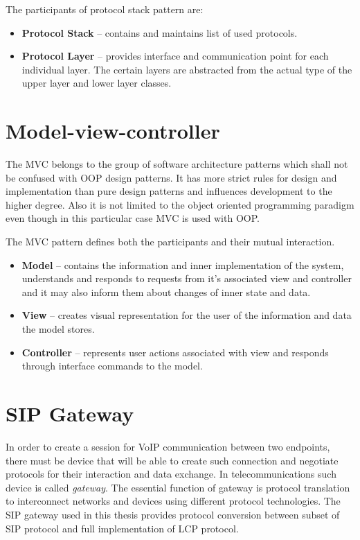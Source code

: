 The participants of protocol stack pattern are:
\begin{itemize}
\item \textbf{Protocol Stack} -- contains and maintains list of used protocols.
\item \textbf{Protocol Layer} -- provides interface and communication point for 
each individual layer. The certain layers are abstracted from the actual type of
the upper layer and lower layer classes.
\end{itemize}



\section{Model-view-controller}
The MVC belongs to the group of software architecture patterns which shall not
be confused with OOP design patterns. It has more strict rules for design
and implementation than pure design patterns and influences development to the
higher degree. Also it is not limited to the object oriented programming 
paradigm even though in this particular case MVC is used with OOP.

The MVC pattern defines both the participants and their mutual interaction.
\begin{itemize}
\item \textbf{Model} -- contains the information and inner implementation of
the system, understands and responds to requests from it's associated view and 
controller and it may also inform them about changes of inner state and data.
\item \textbf{View} -- creates visual representation for the user of the
information and data the model stores.                 
\item \textbf{Controller} -- represents user actions associated with view and
responds through interface commands to the model.
\end{itemize} 

\section{SIP Gateway}
In order to create a session for VoIP communication between two endpoints, 
there must be device that will be able to create such connection and negotiate
protocols for their interaction and data exchange. In telecommunications such
device is called \textit{gateway}. The essential function of gateway is 
protocol translation to interconnect networks and devices using different
protocol technologies. The SIP gateway used in this thesis provides protocol
conversion between subset of SIP protocol and full implementation of LCP 
protocol.

